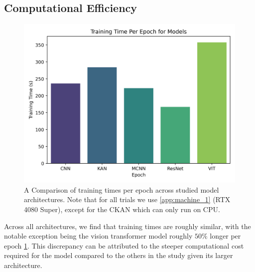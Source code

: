 \documentclass[conference]{IEEEtran}
\begin{document}
\subsection{Computational Efficiency}
\begin{figure}[H]
    \centering
    \includegraphics[width=1\linewidth]{visuals/training_times_per_epoch.png}
    \caption{A Comparison of training times per epoch across studied model architectures. Note that for all trials we use \ref{app:machine_1} (RTX 4080 Super), except for the CKAN which can only run on CPU.}
    \label{fig:training-times}
\end{figure}

Across all architectures, we find that training times are roughly similar, with the notable exception being the vision transformer model roughly $50\%$ longer per epoch \ref{fig:training-times}. This discrepancy can be attributed to the steeper computational cost required for the model compared to the others in the study given its larger architecture.

\end{document}
